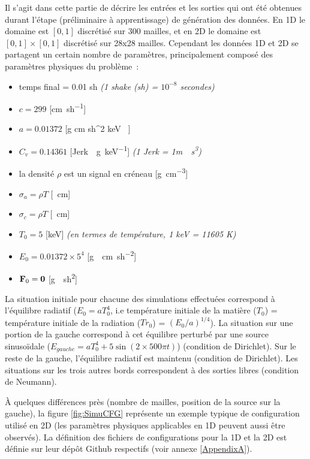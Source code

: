 Il s'agit dans cette partie de décrire les entrées et les sorties qui ont été obtenues durant l'étape (préliminaire à apprentissage) de génération des données. En 1D le domaine est $[0,1]$ discrétisé sur 300 mailles, et en 2D le domaine est $[0,1] \times [0,1]$ discrétisé sur 28x28 mailles. Cependant les données 1D et 2D se partagent un certain nombre de paramètres, principalement composé des paramètres physiques du problème :
\begin{itemize}
  \item temps final = 0.01 \si{sh} \textit{(1 shake (\si{sh}) = $10^{-8}$ secondes)}
  \item $c = 299$ [\si{\cm \per sh}]
  \item $a = 0.01372$ [\si{g \per cm \per sh^2  \per keV }]
  \item $C_v = 0.14361$ [\si{Jerk \per\g \per keV}] \textit{(1 \si{Jerk} = 1\si{m \per \s\cubed})}
  \item la densité $\rho$ est un signal en créneau [\si{\g\per\cm\cubed}]
  \item $\sigma_a = \rho T$ [\si{\per\cm}]
  \item $\sigma_c = \rho T$ [\si{\per\cm}]
  \item $T_0 = 5$ [\si{keV}] \textit{(en termes de température, 1 \si{keV} = 11605 \si{K})}
  \item $E_0 = 0.01372\times 5^4$ [\si{g \per \cm \per sh^2}]
  \item $\mathbf{F}_0 = \mathbf{0}$ [\si{g \per sh^2}]
\end{itemize}

La situation initiale pour chacune des simulations effectuées correspond à l'équilibre radiatif ($E_0=aT_0^4$, i.e température initiale de la matière ($T_0$) = température initiale de la radiation ($Tr_0$) = $(E_0/a)^{1/4}$). La situation sur une portion de la gauche correspond à cet équilibre perturbé par une source sinusoïdale ($ E_{gauche} = aT_{0}^4 + 5 \sin (2 \times 500 \pi t) $) (condition de Dirichlet). Sur le reste de la gauche, l'équilibre radiatif est maintenu (condition de Dirichlet). Les situations sur les trois autres bords correspondent à des sorties libres (condition de Neumann).

À quelques différences près (nombre de mailles, position de la source sur la gauche), la figure \ref{fig:SimuCFG} représente un exemple typique de configuration utilisé en 2D (les paramètres physiques applicables en 1D peuvent aussi être observés). La définition des fichiers de configurations pour la 1D et la 2D est définie sur leur dépôt Github respectifs (voir annexe \ref{AppendixA}).


